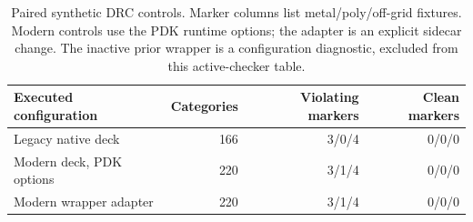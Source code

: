 \begin{table}[htbp]\centering\small\setlength{\tabcolsep}{4pt}
\caption{Paired synthetic DRC controls. Marker columns list metal/poly/off-grid fixtures. Modern controls use the PDK runtime options; the adapter is an explicit sidecar change. The inactive prior wrapper is a configuration diagnostic, excluded from this active-checker table.}\label{tab:drccontrols}
\begin{tabular}{@{}lrrr@{}}\toprule
Executed configuration & Categories & Violating markers & Clean markers \\
\midrule
Legacy native deck & 166 & 3/0/4 & 0/0/0 \\
Modern deck, PDK options & 220 & 3/1/4 & 0/0/0 \\
Modern wrapper adapter & 220 & 3/1/4 & 0/0/0 \\
\bottomrule\end{tabular}\end{table}

